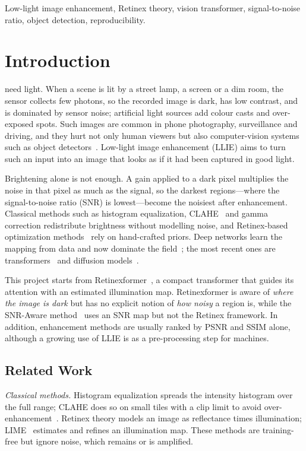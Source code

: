 \documentclass[journal]{IEEEtran}
\begin{document}
\begin{IEEEkeywords}
Low-light image enhancement, Retinex theory, vision transformer, signal-to-noise ratio, object detection, reproducibility.
\end{IEEEkeywords}

\section{Introduction}
 need light. When a scene is lit by a street lamp, a screen or a dim room, the sensor
collects few photons, so the recorded image is dark, has low contrast, and is dominated by sensor noise; artificial
light sources add colour casts and over-exposed spots. Such images are common in phone photography,
surveillance and driving, and they hurt not only human viewers but also computer-vision systems such as object
detectors~\cite{li2022survey,loh2019exdark}. Low-light image enhancement (LLIE) aims to turn such an input into an
image that looks as if it had been captured in good light.

Brightening alone is not enough. A gain applied to a dark pixel multiplies the noise in that pixel as much as the
signal, so the darkest regions---where the signal-to-noise ratio (SNR) is lowest---become the noisiest after
enhancement. Classical methods such as histogram equalization, CLAHE~\cite{zuiderveld1994clahe} and gamma
correction redistribute brightness without modelling noise, and Retinex-based optimization
methods~\cite{guo2017lime} rely on hand-crafted priors. Deep networks learn the mapping from data and now dominate
the field~\cite{li2022survey}; the most recent ones are transformers~\cite{xu2022snr,wang2023llformer,cai2023retinexformer}
and diffusion models~\cite{hou2023gsad,yi2023diffretinex}.

This project starts from Retinexformer~\cite{cai2023retinexformer}, a compact transformer that guides its attention
with an estimated illumination map. Retinexformer is aware of \emph{where the image is dark} but has no explicit
notion of \emph{how noisy} a region is, while the SNR-Aware method~\cite{xu2022snr} uses an SNR map but not the
Retinex framework. In addition, enhancement methods are usually ranked by PSNR and SSIM alone, although a growing use
of LLIE is as a pre-processing step for machines.

\subsection{Related Work}
\emph{Classical methods.} Histogram equalization spreads the intensity histogram over the full range; CLAHE does
so on small tiles with a clip limit to avoid over-enhancement~\cite{zuiderveld1994clahe}. Retinex theory models an
image as reflectance times illumination; LIME~\cite{guo2017lime} estimates and refines an illumination map. These
methods are training-free but ignore noise, which remains or is amplified.
\end{document}
